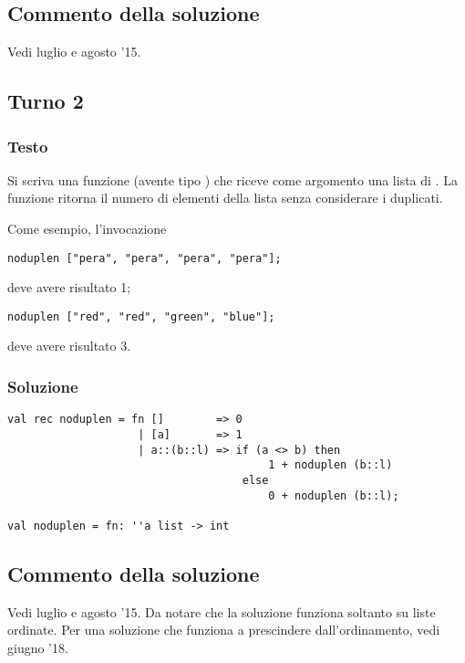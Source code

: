 \subsection{Commento della soluzione}

Vedi luglio e agosto '15.


\subsection{Turno 2}

\subsubsection{Testo}

Si scriva una funzione  (avente tipo ) che riceve come argomento una lista di .
La funzione  ritorna il numero di elementi della lista senza considerare i duplicati.

\medskip
Come esempio, l'invocazione

\begin{lstlisting}
noduplen ["pera", "pera", "pera", "pera"];
\end{lstlisting}

deve avere risultato 1;

\begin{lstlisting}
noduplen ["red", "red", "green", "blue"];
\end{lstlisting}

deve avere risultato 3.

\subsubsection{Soluzione}

\begin{lstlisting}[style = SML, caption = {Definizione della funzione \sml{noduplen}}]
val rec noduplen = fn []		=> 0
					| [a]		=> 1
					| a::(b::l)	=> if (a <> b) then
										1 + noduplen (b::l)
									else
										0 + noduplen (b::l);

val noduplen = fn: ''a list -> int
\end{lstlisting}

\subsection{Commento della soluzione}

Vedi luglio e agosto '15.
Da notare che la soluzione funziona soltanto su liste ordinate. Per una soluzione che funziona a prescindere dall'ordinamento, vedi giugno '18.
